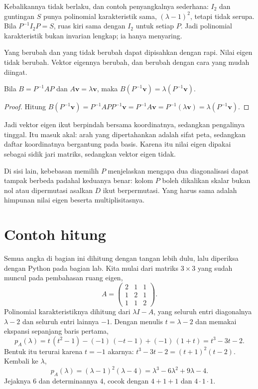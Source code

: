 Kebalikannya tidak berlaku, dan contoh penyangkalnya sederhana: $I_{2}$ dan guntingan $S$ punya
polinomial karakteristik sama, $(\lambda-1)^{2}$, tetapi tidak serupa. Bila $P^{-1}I_{2}P=S$, ruas
kiri sama dengan $I_{2}$ untuk setiap $P$. Jadi polinomial karakteristik bukan invarian lengkap; ia
hanya menyaring.

Yang berubah dan yang tidak berubah dapat dipisahkan dengan rapi. Nilai eigen tidak berubah.
Vektor eigennya berubah, dan berubah dengan cara yang mudah diingat.

\begin{proposisi}
Bila $B=P^{-1}AP$ dan $A\mathbf{v}=\lambda\mathbf{v}$, maka
$B(P^{-1}\mathbf{v})=\lambda(P^{-1}\mathbf{v})$.
\end{proposisi}

\begin{proof}
Hitung $B(P^{-1}\mathbf{v})=P^{-1}APP^{-1}\mathbf{v}=P^{-1}A\mathbf{v}
=P^{-1}(\lambda\mathbf{v})=\lambda(P^{-1}\mathbf{v})$.
\end{proof}

Jadi vektor eigen ikut berpindah bersama koordinatnya, sedangkan pengalinya tinggal. Itu masuk
akal: arah yang dipertahankan adalah sifat peta, sedangkan daftar koordinatnya bergantung pada
basis. Karena itu nilai eigen dipakai sebagai sidik jari matriks, sedangkan vektor eigen tidak.

Di sisi lain, kebebasan memilih $P$ menjelaskan mengapa dua diagonalisasi dapat tampak berbeda
padahal keduanya benar: kolom $P$ boleh dikalikan skalar bukan nol atau dipermutasi asalkan $D$ ikut
berpermutasi. Yang harus sama adalah himpunan nilai eigen beserta multiplisitasnya.

\section{Contoh hitung}

Semua angka di bagian ini dihitung dengan tangan lebih dulu, lalu diperiksa dengan Python pada
bagian lab. Kita mulai dari matriks $3\times3$ yang sudah muncul pada pembahasan ruang eigen,
\[
  A=\begin{pmatrix}2&1&1\\ 1&2&1\\ 1&1&2\end{pmatrix}.
\]
Polinomial karakteristiknya dihitung dari $\lambda I-A$, yang seluruh entri diagonalnya
$\lambda-2$ dan seluruh entri lainnya $-1$. Dengan menulis $t=\lambda-2$ dan memakai ekspansi
sepanjang baris pertama,
\[
  p_{A}(\lambda)=t\,(t^{2}-1)-(-1)\,(-t-1)+(-1)\,(1+t)=t^{3}-3t-2 .
\]
Bentuk itu terurai karena $t=-1$ akarnya: $t^{3}-3t-2=(t+1)^{2}(t-2)$. Kembali ke $\lambda$,
\[
  p_{A}(\lambda)=(\lambda-1)^{2}(\lambda-4)=\lambda^{3}-6\lambda^{2}+9\lambda-4 .
\]
Jejaknya $6$ dan determinannya $4$, cocok dengan $4+1+1$ dan $4\cdot1\cdot1$.

